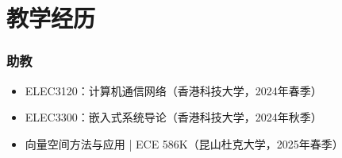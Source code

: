 \documentclass[10pt,a4paper]{article}
\begin{document}
\section*{\color{sectioncolor}教学经历}
\subsubsection*{\color{itemcolor}助教}
\begin{itemize}[leftmargin=*]
    \item ELEC3120：计算机通信网络（香港科技大学，2024年春季）
    \item ELEC3300：嵌入式系统导论（香港科技大学，2024年秋季）
    \item 向量空间方法与应用 | ECE 586K（昆山杜克大学，2025年春季）
\end{itemize}
\end{document}
